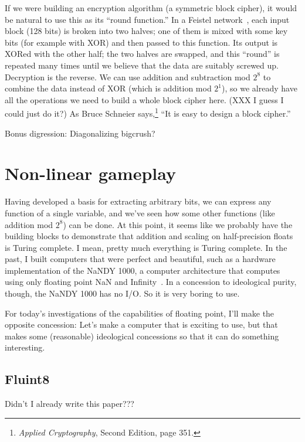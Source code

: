 \documentclass[twocolumn]{article}
\begin{document}
If we were building an encryption algorithm (a symmetric block
cipher), it would be natural to use this as its ``round function.'' In
a Feistel network~\cite{feistel1973cryptography}, each input block
(128 bits) is broken into two halves; one of them is mixed with some
key bits (for example with XOR) and then passed to this function. Its
output is XORed with the other half; the two halves are swapped, and
this ``round'' is repeated many times until we believe that the data
are suitably screwed up. Decryption is the reverse. We can use
addition and subtraction mod $2^8$ to combine the data instead of XOR
(which is addition mod $2^1$), so we already have all the operations
we need to build a whole block cipher here. (XXX I guess I could just do
it?) As Bruce Schneier says,\footnote{{\it Applied Cryptography},
  Second Edition, page 351.} ``It is easy to design a block cipher.''

Bonus digression:
Diagonalizing bigcrush?


\section{Non-linear gameplay} \label{sec:sixtyfive}
Having developed a basis for extracting arbitrary bits, we can express
any function of a single variable, and we've seen how some other
functions (like addition mod $2^8$) can be done. At this point, it
seems like we probably have the building blocks to demonstrate that
addition and scaling on half-precision floats is Turing complete. I
mean, pretty much everything is Turing complete. In the past, I built
computers that were perfect and beautiful, such as a hardware
implementation of the NaNDY 1000, a computer architecture that
computes using only floating point NaN and
Infinity~\cite{murphy2019nan}. In a concession to ideological purity,
though, the NaNDY 1000 has no I/O. So it is very boring to use.

For today's investigations of the capabilities of floating point, I'll
make the opposite concession: Let's make a computer that is exciting
to use, but that makes some (reasonable) ideological concessions so that
it can do something interesting.

\subsection{Fluint8}

Didn't I already write this paper???
\end{document}
